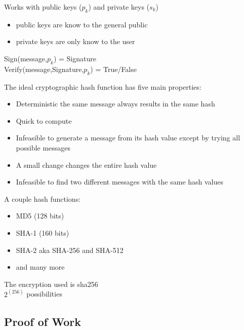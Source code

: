 \documentclass{beamer}
\begin{document}
\begin{frame}
    Works with public keys ($p_k$) and private keys ($s_k$)
    \pause
    \begin{itemize}
        \item public keys are know to the general public
            \pause
        \item private keys are only know to the user
            \pause
    \end{itemize}
    \begin{block}{}
        Sign(message,$p_k$) = Signature\\
        \pause
        Verify(message,Signature,$p_k$) = True/False
    \end{block}
\end{frame}

\begin{frame}
    The ideal cryptographic hash function has five main properties:
    \begin{itemize}
        \item Deterministic the same message always results in the same hash
        \item Quick to compute
        \item Infeasible to generate a message from its hash value except by trying all possible messages
        \item A small change changes the entire hash value
        \item Infeasible to find two different messages with the same hash values
    \end{itemize}
\end{frame}
\begin{frame}
    A couple hash functions:
    \begin{itemize}
        \item MD5 (128 bits)
        \item SHA-1 (160 bits)
        \item SHA-2 aka SHA-256 and SHA-512 
        \item and many more
    \end{itemize}
    \pause
    The encryption used is sha256\\
    \pause
    $2^(256)$ possibilities
\end{frame}
\subsection{Proof of Work}
\end{document}
